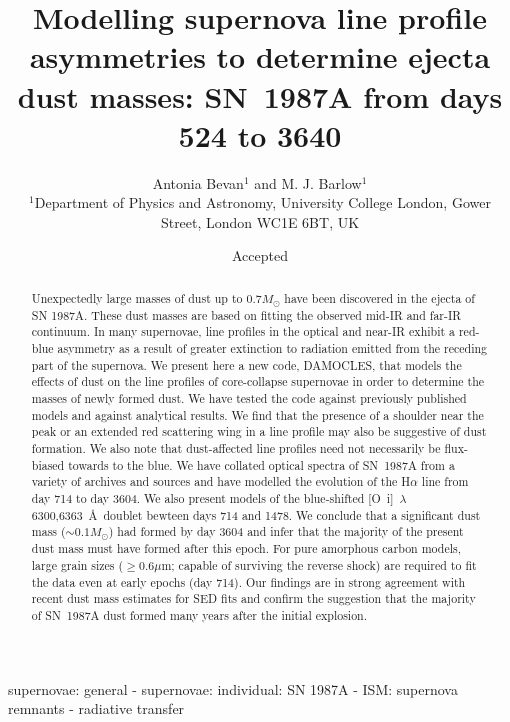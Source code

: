 \documentclass[useAMS,usenatbib,usegraphicx]{mnras}
\title[The first ten years of dust evolution in SN~1987A from 
optical line profile asymmetries]{Modelling supernova line profile asymmetries to determine ejecta dust masses:  SN~1987A from days 524 to 3640}
\author[Antonia Bevan and M. J. Barlow]{Antonia Bevan$^{1}$ and M. J. 
Barlow$^{1}$\\
$^{1}$Department of Physics and Astronomy, University College London, 
Gower Street, London WC1E 6BT, UK}
\begin{document}
\date{Accepted}

\pagerange{\pageref{firstpage}--\pageref{lastpage}} 

\maketitle

\label{firstpage}

\begin{abstract}

Unexpectedly large masses of dust up to $0.7M_{\odot}$ have been 
discovered in the ejecta of SN 1987A.  These dust masses are based on 
fitting the observed mid-IR and far-IR continuum.  In many 
supernovae, line profiles in the optical and near-IR exhibit a red-blue 
asymmetry as a result of greater extinction to radiation emitted from the 
receding part of the supernova.  We  present here a new code, DAMOCLES, 
that models the effects of dust on the line profiles of core-collapse 
supernovae in order to determine the masses of newly formed dust.  We have 
tested the code against previously published models and against analytical 
results.  We find that the presence of a shoulder near the peak or an 
extended red scattering wing in a line profile may also be suggestive of dust 
formation.  We also note that dust-affected line profiles need not 
necessarily be flux-biased towards to the blue. We have collated optical spectra of SN~1987A from a variety 
of archives and sources and have modelled the evolution of the H$\alpha$ line from day 714 
to day 3604.  We also present models of the blue-shifted 
[O~{\sc i}]~$\lambda$6300,6363~\AA\ doublet bewteen days 714 and 1478.  We 
conclude that a significant dust mass ($\sim 0.1M_{\odot}$) had 
formed by day 3604 and infer that the majority of the present dust mass must 
have formed after this epoch.  For pure amorphous carbon models, large grain 
sizes ($\geqslant 0.6\mu$m; capable of surviving the reverse shock) are 
required to fit the data even at early epochs (day 714).  Our 
findings are in strong agreement with recent dust mass estimates for SED fits and confirm 
the suggestion that the majority of SN~1987A dust formed many years after the 
initial explosion.

\end{abstract}

\begin{keywords}
supernovae: general  -  supernovae: individual: SN 1987A  -  ISM: 
supernova remnants  - radiative transfer
\end{keywords}
\end{document}
